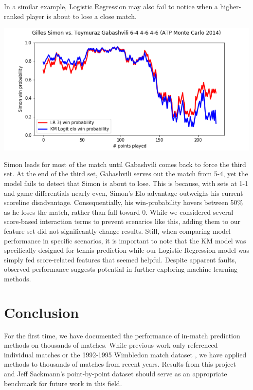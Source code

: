 \documentclass[chapterprefix=false]{report}
\begin{document}
In a similar example, Logistic Regression may also fail to notice when a higher-ranked player is about to lose a close match.

\includegraphics[scale=.7]{simon_gabashvili}

Simon leads for most of the match until Gabashvili comes back to force the third set. At the end of the third set, Gabashvili serves out the match from 5-4, yet the model fails to detect that Simon is about to lose. This is because, with sets at 1-1 and game differentials nearly even, Simon's Elo advantage outweighs his current scoreline disadvantage. Consequentially, his win-probability hovers between 50\% as he loses the match, rather than fall toward 0. While we considered several score-based interaction terms to prevent scenarios like this, adding them to our feature set did not significantly change results. Still, when comparing model performance in specific scenarios, it is important to note that the KM model was specifically designed for tennis prediction while our Logistic Regression model was simply fed score-related features that seemed helpful. Despite apparent faults, observed performance suggests potential in further exploring machine learning methods.



\chapter{Conclusion}

For the first time, we have documented the performance of in-match prediction methods on thousands of matches. While previous work only referenced individual matches or the 1992-1995 Wimbledon match dataset \citep{Klaassen2003}, we have applied methods to thousands of matches from recent years. Results from this project and Jeff Sackmann's point-by-point dataset should serve as an appropriate benchmark for future work in this field.
\end{document}
